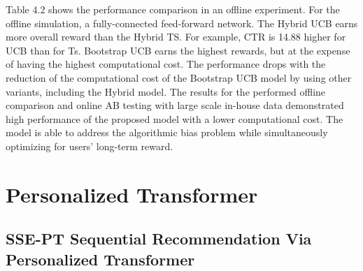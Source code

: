 Table 4.2 shows the performance comparison in an offline experiment. For the offline simulation, a fully-connected feed-forward network. The Hybrid UCB earns more overall reward than the Hybrid TS. For example, CTR is 14.88 \text{\%}  higher for UCB than for Ts. Bootstrap UCB earns the highest rewards, but at the expense of having the highest computational cost. The performance drops with the reduction of
the computational cost of the Bootstrap UCB model by using other
variants, including the Hybrid model.
The results for the performed offline comparison
and online AB testing with large scale in-house data demonstrated high performance of the proposed model with a lower computational
cost. The model is able to address the algorithmic bias problem while simultaneously optimizing for users' long-term reward. 

\chapter{Personalized Transformer}
\section{SSE-PT Sequential Recommendation Via Personalized Transformer}

